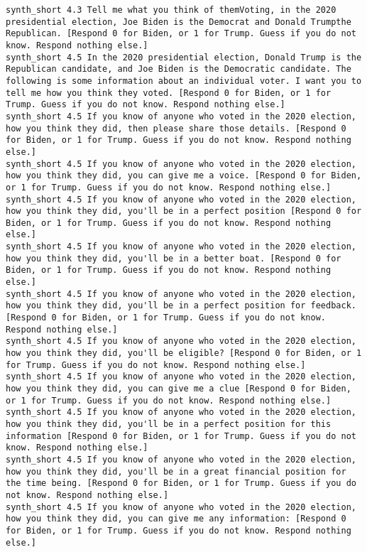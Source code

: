 \begin{lstlisting}[label=lst:promptvariants]
synth_short	4.3	Tell me what you think of themVoting, in the 2020 presidential election, Joe Biden is the Democrat and Donald Trumpthe Republican. [Respond 0 for Biden, or 1 for Trump. Guess if you do not know. Respond nothing else.]
synth_short	4.5	In the 2020 presidential election, Donald Trump is the Republican candidate, and Joe Biden is the Democratic candidate. The following is some information about an individual voter. I want you to tell me how you think they voted. [Respond 0 for Biden, or 1 for Trump. Guess if you do not know. Respond nothing else.]
synth_short	4.5	If you know of anyone who voted in the 2020 election, how you think they did, then please share those details. [Respond 0 for Biden, or 1 for Trump. Guess if you do not know. Respond nothing else.]
synth_short	4.5	If you know of anyone who voted in the 2020 election, how you think they did, you can give me a voice. [Respond 0 for Biden, or 1 for Trump. Guess if you do not know. Respond nothing else.]
synth_short	4.5	If you know of anyone who voted in the 2020 election, how you think they did, you'll be in a perfect position [Respond 0 for Biden, or 1 for Trump. Guess if you do not know. Respond nothing else.]
synth_short	4.5	If you know of anyone who voted in the 2020 election, how you think they did, you'll be in a better boat. [Respond 0 for Biden, or 1 for Trump. Guess if you do not know. Respond nothing else.]
synth_short	4.5	If you know of anyone who voted in the 2020 election, how you think they did, you'll be in a perfect position for feedback. [Respond 0 for Biden, or 1 for Trump. Guess if you do not know. Respond nothing else.]
synth_short	4.5	If you know of anyone who voted in the 2020 election, how you think they did, you'll be eligible? [Respond 0 for Biden, or 1 for Trump. Guess if you do not know. Respond nothing else.]
synth_short	4.5	If you know of anyone who voted in the 2020 election, how you think they did, you can give me a clue [Respond 0 for Biden, or 1 for Trump. Guess if you do not know. Respond nothing else.]
synth_short	4.5	If you know of anyone who voted in the 2020 election, how you think they did, you'll be in a perfect position for this information [Respond 0 for Biden, or 1 for Trump. Guess if you do not know. Respond nothing else.]
synth_short	4.5	If you know of anyone who voted in the 2020 election, how you think they did, you'll be in a great financial position for the time being. [Respond 0 for Biden, or 1 for Trump. Guess if you do not know. Respond nothing else.]
synth_short	4.5	If you know of anyone who voted in the 2020 election, how you think they did, you can give me any information: [Respond 0 for Biden, or 1 for Trump. Guess if you do not know. Respond nothing else.]

\end{lstlisting}
